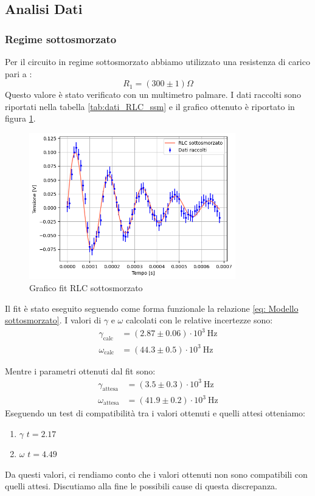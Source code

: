 \documentclass[letterpaper,12pt]{article}
\begin{document}
\subsection{Analisi Dati}

\subsubsection{Regime sottosmorzato}
Per il circuito in regime sottosmorzato abbiamo utilizzato una resistenza di carico pari a : $$R_1 =(300\pm1) \Omega$$
Questo valore è stato verificato con un multimetro palmare.
I dati raccolti sono riportati nella tabella \ref{tab:dati_RLC_ssm} e il grafico ottenuto è riportato in figura \ref{fig:fitRLCsotto}.\\
\begin{figure}[h!]
	\centering
	\includegraphics[width=0.8\textwidth]{RLCsotto.png}
	\caption{Grafico fit RLC sottosmorzato}
	\label{fig:fitRLCsotto}
\end{figure}

Il fit è stato eseguito seguendo come forma funzionale la relazione \eqref{eq: Modello sottosmorzato}.
I valori di $\gamma$ e $\omega$ calcolati con le relative incertezze sono:
\begin{align*}
    \gamma_\text{calc} & = (2.87 \pm 0.06) \cdot 10^3\ \text{Hz} \\
    \omega_\text{calc} & = (44.3 \pm 0.5) \cdot 10^3\ \text{Hz}
\end{align*}

Mentre i parametri ottenuti dal fit sono:
\begin{align*}
    \gamma_\text{attesa} & = (3.5 \pm 0.3) \cdot 10^3\ \text{Hz} \\
    \omega_\text{attesa} & = (41.9 \pm 0.2) \cdot 10^3\ \text{Hz}
\end{align*}
Eseguendo un test di compatibilità tra i valori ottenuti e quelli attesi otteniamo:
\begin{enumerate}
    \item $\gamma$ \quad  $t = 2.17$
    \item $\omega$ \quad $t = 4.49$
\end{enumerate}
Da questi valori, ci rendiamo conto che i valori ottenuti non sono compatibili con quelli attesi. 
Discutiamo alla fine le possibili cause di questa discrepanza. \\
\end{document}
